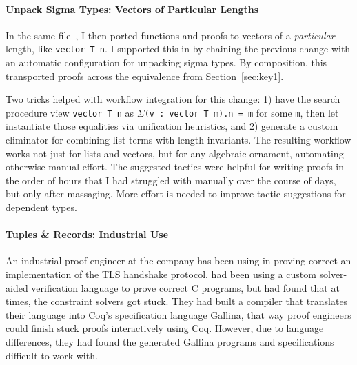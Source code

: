 \paragraph{Unpack Sigma Types: Vectors of Particular Lengths}
In the same file~\href{https://github.com/uwplse/pumpkin-pi/blob/v2.0.0/plugin/coq/examples/Example.v}{}, I then ported functions and proofs to 
vectors of a \textit{particular} length, like \lstinline{vector T n}.
I supported this in \toolnamec by chaining the previous change
with an automatic configuration for unpacking sigma types.
By composition, this transported proofs across the equivalence from Section~\ref{sec:key1}.

Two tricks helped with workflow integration for this change:
1) have the search procedure view \lstinline{vector T n} as 
$\Sigma$\lstinline{(v : vector T m).n = m} for some \lstinline{m},
then let \toolnamec instantiate those equalities via unification heuristics, %
and 2) generate a custom eliminator for combining
list terms with length invariants.
The resulting workflow works not just for lists and vectors, but for any algebraic ornament,
automating otherwise manual effort.
The suggested tactics were helpful for writing proofs in the order of hours
that I had struggled with manually over the course of days, but only after massaging.
More effort is needed to improve tactic suggestions for dependent types.

\paragraph{Tuples \& Records: Industrial Use}
An industrial proof engineer at the company \company has been using \toolnamec in proving
correct an implementation of the TLS handshake protocol.
\company had been using a custom solver-aided verification language to prove correct C programs,
but had found that at times, the constraint solvers got stuck.
They had built a compiler that translates their language into Coq's specification language Gallina,
that way proof engineers could finish stuck proofs interactively using Coq.
However, due to language differences, they had found the generated Gallina programs and specifications difficult to work with.

